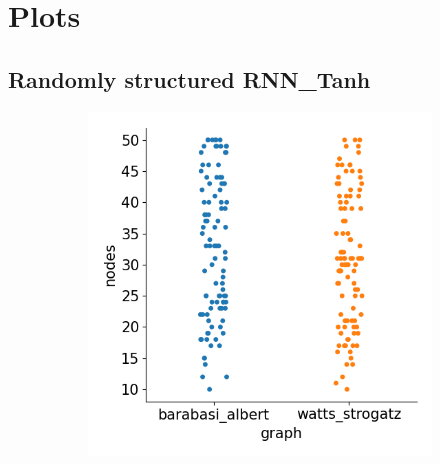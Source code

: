 
\chapter{Plots}

\section{Randomly structured RNN\_Tanh}\label{app:rs_tanh}

\begin{figure}[H]
    \centering
    \begin{subfigure}{0.4\textwidth}
        \includegraphics[width=\linewidth]{images/results/random/tanh/graph_nodes.png}
        \caption{} \label{fig:tanh_graph_nodes}
    \end{subfigure}%
    \hfill
    \begin{subfigure}{0.4\textwidth}

\end{subfigure}
\end{figure}
